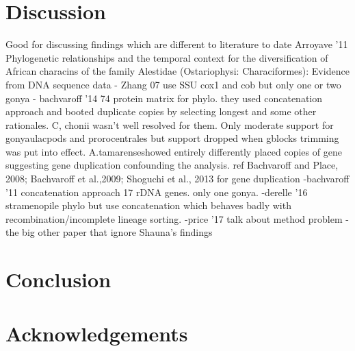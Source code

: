 \documentclass[12pt]{article}
\begin{document}
\newpage
\section{Discussion}
Good for discussing findings which are different to literature to date Arroyave '11 Phylogenetic relationships and the temporal context for the diversification
of African characins of the family Alestidae (Ostariophysi: Characiformes): Evidence from DNA sequence data
- Zhang 07 use SSU cox1 and cob but only one or two gonya
- bachvaroff '14 74 protein matrix for phylo. they used concatenation approach and booted duplicate copies by selecting longest and some other rationales. C, chonii wasn't well resolved for them. Only moderate support for gonyaulacpods and prorocentrales but support dropped when gblocks trimming was put into effect. A.tamarenseshowed entirely differently placed copies of gene suggesting gene duplication confounding the analysis.  ref Bachvaroff and Place, 2008; Bachvaroff et al.,2009; Shoguchi et al., 2013 for gene duplication
-bachvaroff '11 concatenation approach 17 rDNA genes. only one gonya.
-derelle '16 stramenopile phylo but use concatenation which behaves badly with recombination/incomplete lineage sorting.
-price '17 talk about method problem
- the big other paper that ignore Shauna's findings




\newpage
\section{Conclusion}
\newpage

\section{Acknowledgements}


\end{document}
